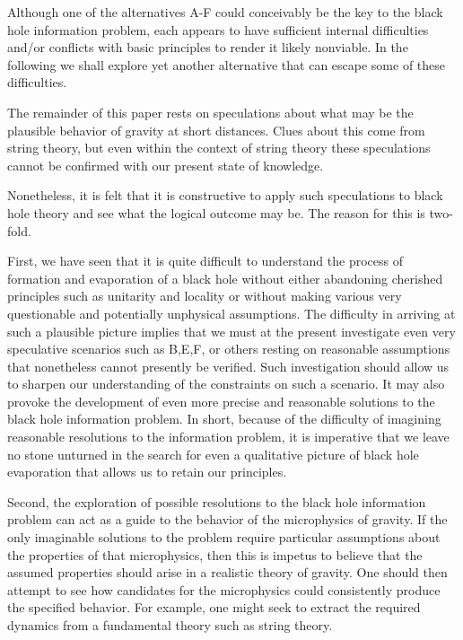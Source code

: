 Although one of the alternatives A-F could conceivably be the key to
the black hole information problem, each appears to have sufficient
internal difficulties and/or conflicts with basic principles to render it
likely nonviable.  In the following we shall explore yet another
alternative that can escape some of these difficulties.
%
%
%


The remainder of this paper rests on speculations about
what may be the plausible behavior of gravity at short
distances.  Clues about this come from string theory, but even within the
context of string theory these speculations cannot be confirmed with our
present state of knowledge.

Nonetheless, it is felt that it is constructive to apply such
speculations to black hole theory and see what the logical outcome may be.
The reason for this is two-fold.

First,
we have seen that it is quite difficult to understand the process of
formation and evaporation of a black hole without either abandoning
cherished principles such as unitarity and locality or without
making various very
questionable and potentially unphysical assumptions.
The difficulty in arriving at such a plausible picture implies that
we must at the present investigate even very
speculative scenarios such as B,E,F, or others resting on
reasonable assumptions that nonetheless cannot presently be verified.
Such investigation should allow us to sharpen our
understanding of the constraints on such a scenario.  It may also
provoke the development of even more precise and reasonable
solutions to the black hole information problem.
In short, because of the difficulty of imagining reasonable resolutions to
the information problem, it is
imperative that we leave no stone unturned in the search for
even a qualitative
picture of black hole evaporation that allows us to retain our principles.

Second, the exploration of possible resolutions to the black hole
information problem can act as a guide to the behavior of the
microphysics of gravity.  If the only imaginable solutions to the problem
require particular
assumptions about the properties of that microphysics, then this is
impetus to believe that the assumed properties should arise in a
realistic theory of gravity.
One should then attempt
to see how candidates for the  microphysics could consistently
produce the specified behavior.
For example, one might seek to extract the required dynamics
from a fundamental theory such as string theory.

